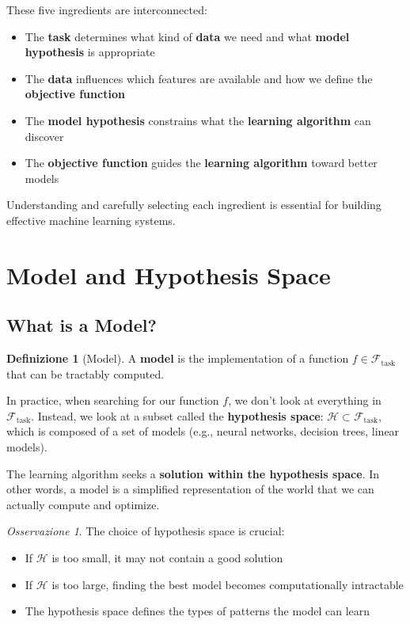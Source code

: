 \documentclass[11pt,a4paper]{article}
\theoremstyle{definition}
\newtheorem{definition}{Definizione}[section]
\theoremstyle{plain}
\theoremstyle{remark}
\newtheorem*{observation}{Osservazione}
\begin{document}
These five ingredients are interconnected:
\begin{itemize}
    \item The \textbf{task} determines what kind of \textbf{data} we need and what \textbf{model hypothesis} is appropriate
    \item The \textbf{data} influences which features are available and how we define the \textbf{objective function}
    \item The \textbf{model hypothesis} constrains what the \textbf{learning algorithm} can discover
    \item The \textbf{objective function} guides the \textbf{learning algorithm} toward better models
\end{itemize}

Understanding and carefully selecting each ingredient is essential for building effective machine learning systems.

\section{Model and Hypothesis Space}

\subsection{What is a Model?}

\begin{definition}[Model]
A \textbf{model} is the implementation of a function $f \in \mathcal{F}_{\text{task}}$ that can be tractably computed.
\end{definition}

In practice, when searching for our function $f$, we don't look at everything in $\mathcal{F}_{\text{task}}$. Instead, we look at a subset called the \textbf{hypothesis space}: $\mathcal{H} \subset \mathcal{F}_{\text{task}}$, which is composed of a set of models (e.g., neural networks, decision trees, linear models).

The learning algorithm seeks a \textbf{solution within the hypothesis space}. In other words, a model is a simplified representation of the world that we can actually compute and optimize.

\begin{observation}
The choice of hypothesis space is crucial:
\begin{itemize}
    \item If $\mathcal{H}$ is too small, it may not contain a good solution
    \item If $\mathcal{H}$ is too large, finding the best model becomes computationally intractable
    \item The hypothesis space defines the types of patterns the model can learn
\end{itemize}
\end{observation}
\end{document}
